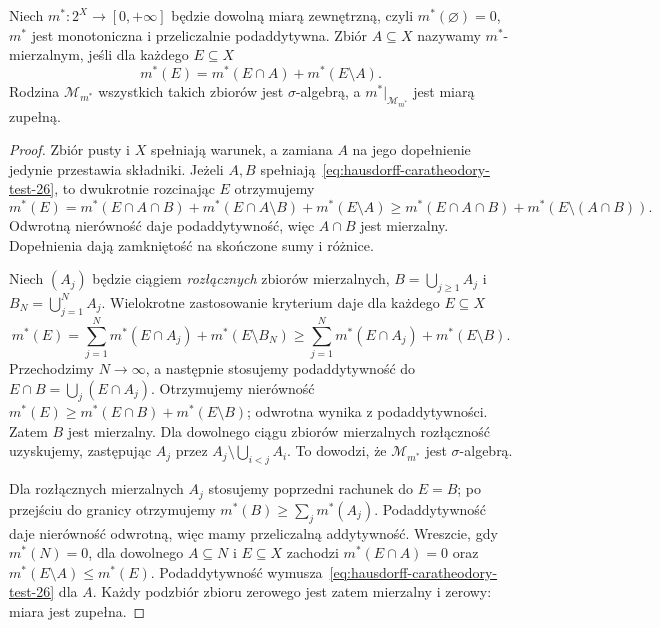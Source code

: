 \begin{lemat}
\label{lem:hausdorff-caratheodory-selfcontained-26}
Niech $m^*:2^X\to[0,+\infty]$ będzie dowolną
miarą zewnętrzną, czyli $m^*(\varnothing)=0$,
$m^*$ jest monotoniczna i przeliczalnie
podaddytywna. Zbiór $A\subseteq X$ nazywamy
$m^*$-mierzalnym, jeśli dla każdego $E\subseteq X$
\begin{equation}\label{eq:hausdorff-caratheodory-test-26}
 m^*(E)=m^*(E\cap A)+m^*(E\setminus A).
\end{equation}
Rodzina $\mathcal M_{m^*}$ wszystkich takich zbiorów
jest $\sigma$-algebrą, a $m^*|_{\mathcal M_{m^*}}$
jest miarą zupełną.
\end{lemat}
\begin{proof}
Zbiór pusty i $X$ spełniają warunek, a zamiana $A$
na jego dopełnienie jedynie przestawia składniki.
Jeżeli $A,B$ spełniają~\eqref{eq:hausdorff-caratheodory-test-26},
to dwukrotnie rozcinając $E$ otrzymujemy
\[
 m^*(E)=m^*(E\cap A\cap B)
 +m^*(E\cap A\setminus B)+m^*(E\setminus A)
 \geq m^*(E\cap A\cap B)+m^*(E\setminus(A\cap B)).
\]
Odwrotną nierówność daje podaddytywność, więc
$A\cap B$ jest mierzalny. Dopełnienia dają
zamkniętość na skończone sumy i różnice.

Niech $(A_j)$ będzie ciągiem \emph{rozłącznych}
zbiorów mierzalnych, $B=\bigcup_{j\ge1}A_j$
i $B_N=\bigcup_{j=1}^NA_j$. Wielokrotne
zastosowanie kryterium daje dla każdego $E\subseteq X$
\[
 m^*(E)=\sum_{j=1}^Nm^*(E\cap A_j)
 +m^*(E\setminus B_N)
 \geq\sum_{j=1}^Nm^*(E\cap A_j)+m^*(E\setminus B).
\]
Przechodzimy $N\to\infty$, a następnie stosujemy
podaddytywność do $E\cap B=\bigcup_j(E\cap A_j)$.
Otrzymujemy nierówność $m^*(E)\geq
m^*(E\cap B)+m^*(E\setminus B)$;
odwrotna wynika z podaddytywności. Zatem $B$
jest mierzalny. Dla dowolnego ciągu zbiorów
mierzalnych rozłączność uzyskujemy, zastępując
$A_j$ przez $A_j\setminus\bigcup_{i<j}A_i$.
To dowodzi, że $\mathcal M_{m^*}$ jest $\sigma$-algebrą.

Dla rozłącznych mierzalnych $A_j$ stosujemy
poprzedni rachunek do $E=B$; po przejściu
do granicy otrzymujemy
$m^*(B)\geq\sum_jm^*(A_j)$.
Podaddytywność daje nierówność odwrotną,
więc mamy przeliczalną addytywność.
Wreszcie, gdy $m^*(N)=0$, dla dowolnego $A\subseteq N$
i $E\subseteq X$ zachodzi
$m^*(E\cap A)=0$ oraz
$m^*(E\setminus A)\leq m^*(E)$.
Podaddytywność wymusza~\eqref{eq:hausdorff-caratheodory-test-26}
dla $A$. Każdy podzbiór zbioru zerowego jest zatem
mierzalny i zerowy: miara jest zupełna.
\end{proof}

